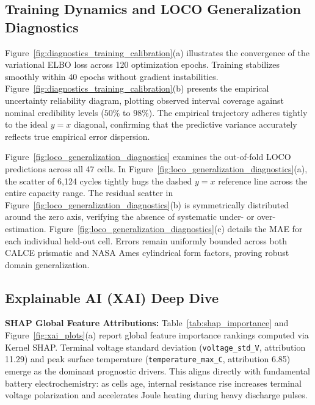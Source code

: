 \documentclass[a4paper,fleqn]{cas-sc}
\begin{document}
\subsection{Training Dynamics and LOCO Generalization Diagnostics}
Figure~\ref{fig:diagnostics_training_calibration}(a) illustrates the convergence of the variational ELBO loss across 120 optimization epochs. Training stabilizes smoothly within 40 epochs without gradient instabilities. Figure~\ref{fig:diagnostics_training_calibration}(b) presents the empirical uncertainty reliability diagram, plotting observed interval coverage against nominal credibility levels ($50\%$ to $98\%$). The empirical trajectory adheres tightly to the ideal $y=x$ diagonal, confirming that the predictive variance accurately reflects true empirical error dispersion.

Figure~\ref{fig:loco_generalization_diagnostics} examines the out-of-fold LOCO predictions across all 47 cells. In Figure~\ref{fig:loco_generalization_diagnostics}(a), the scatter of 6,124 cycles tightly hugs the dashed $y=x$ reference line across the entire capacity range. The residual scatter in Figure~\ref{fig:loco_generalization_diagnostics}(b) is symmetrically distributed around the zero axis, verifying the absence of systematic under- or over-estimation. Figure~\ref{fig:loco_generalization_diagnostics}(c) details the MAE for each individual held-out cell. Errors remain uniformly bounded across both CALCE prismatic and NASA Ames cylindrical form factors, proving robust domain generalization.

\subsection{Explainable AI (XAI) Deep Dive}

\textbf{SHAP Global Feature Attributions:} Table~\ref{tab:shap_importance} and Figure~\ref{fig:xai_plots}(a) report global feature importance rankings computed via Kernel SHAP. Terminal voltage standard deviation (\texttt{voltage\_std\_V}, attribution 11.29) and peak surface temperature (\texttt{temperature\_max\_C}, attribution 6.85) emerge as the dominant prognostic drivers. This aligns directly with fundamental battery electrochemistry: as cells age, internal resistance rise increases terminal voltage polarization and accelerates Joule heating during heavy discharge pulses.
\end{document}
